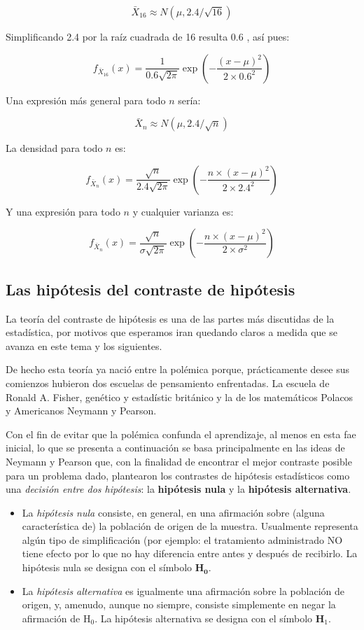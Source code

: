 \documentclass[
]{article}
\begin{document}
\[
\bar{X}_{16} \approx N(\mu, 2.4 / \sqrt{16})
\]

Simplificando 2.4 por la raíz cuadrada de 16 resulta 0.6 , así pues:

\[
f_{\bar{X}_{16}}(x)=\frac{1}{0.6 \sqrt{2 \pi}} \exp \left(-\frac{(x-\mu)^{2}}{2 \times 0.6^{2}}\right)
\]

Una expresión más general para todo \(n\) sería:

\[
\bar{X}_{n} \approx N(\mu, 2.4 / \sqrt{n})
\]

La densidad para todo \(n\) es:

\[
f_{\bar{X}_{n}}(x)=\frac{\sqrt{n}}{2.4 \sqrt{2 \pi}} \exp \left(-\frac{n \times(x-\mu)^{2}}{2 \times 2.4^{2}}\right)
\]

Y una expresión para todo \(n\) y cualquier varianza es:

\[
f_{\bar{X}_{n}}(x)=\frac{\sqrt{n}}{\sigma \sqrt{2 \pi}} \exp \left(-\frac{n \times(x-\mu)^{2}}{2 \times \sigma^{2}}\right)
\]

\subsection{Las hipótesis del contraste de hipótesis}\label{las-hipuxf3tesis-del-contraste-de-hipuxf3tesis}

La teoría del contraste de hipótesis es una de las partes más discutidas de la estadística, por motivos que esperamos iran quedando claros a medida que se avanza en este tema y los siguientes.

De hecho esta teoría ya nació entre la polémica porque, prácticamente desee sus comienzos hubieron dos escuelas de pensamiento enfrentadas. La escuela de Ronald A. Fisher, genético y estadístic británico y la de los matemáticos Polacos y Americanos Neymann y Pearson.

Con el fin de evitar que la polémica confunda el aprendizaje, al menos en esta fae inicial, lo que se presenta a continuación se basa principalmente en las ideas de Neymann y Pearson que, con la finalidad de encontrar el mejor contraste posible para un problema dado, plantearon los contrastes de hipótesis estadísticos como una \emph{decisión entre dos hipótesis}: la \textbf{hipótesis nula} y la \textbf{hipótesis alternativa}.

\begin{itemize}
\item
  La \emph{hipótesis nula} consiste, en general, en una afirmación sobre (alguna característica de) la población de origen de la muestra. Usualmente representa algún tipo de simplificación (por ejemplo: el tratamiento administrado NO tiene efecto por lo que no hay diferencia entre antes y después de recibirlo. La hipótesis nula se designa con el símbolo \(\mathbf{H}_{\mathbf{0}}\).
\item
  La \emph{hipótesis alternativa} es igualmente una afirmación sobre la población de origen, y, amenudo, aunque no siempre, consiste simplemente en negar la afirmación de \(\mathrm{H}_{0}\). La hipótesis alternativa se designa con el símbolo \(\mathbf{H}_{1}\).
\end{itemize}
\end{document}
